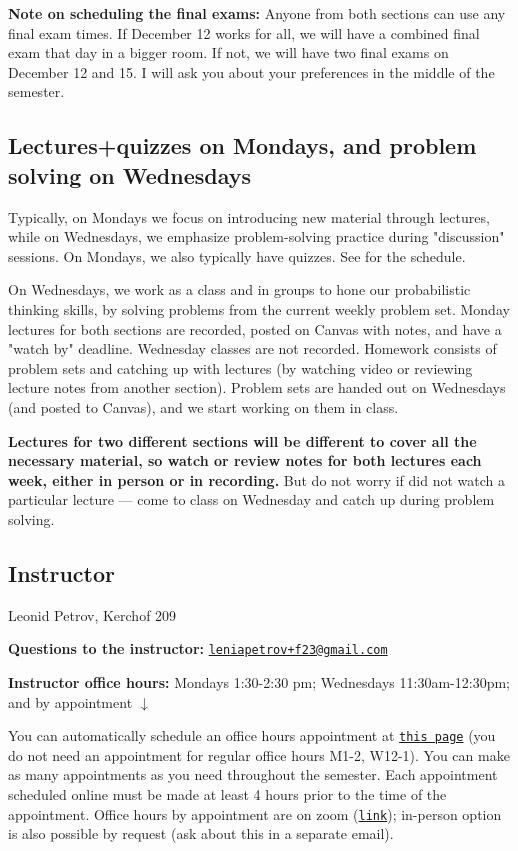 \documentclass[oneside,11pt]{amsart}
\begin{document}
\medskip

\textbf{Note on scheduling the final exams:} Anyone from both sections can use any final exam times. If December 12 works for all, we will have a combined final exam that day in a bigger room. If not, we will have two final exams on December 12 and 15. I will ask you about your preferences in the middle of the semester.


\subsection{Lectures+quizzes on Mondays, and problem solving on Wednesdays}
Typically, on Mondays we focus on introducing new material through lectures, while on Wednesdays, we emphasize problem-solving practice during "discussion" sessions. On Mondays, we also typically have quizzes. See  for the schedule.

On Wednesdays, we work as a class and in groups to hone our probabilistic thinking skills, by solving problems from the current weekly problem set. Monday lectures for both sections are recorded, posted on Canvas with notes, and have a "watch by" deadline. Wednesday classes are not recorded. Homework consists of problem sets and catching up with lectures (by watching video or reviewing lecture notes from another section). Problem sets are handed out on Wednesdays (and posted to Canvas), and we start working on them in class.

\textbf{Lectures for two different sections will be different to cover all the necessary material, so watch or review notes for both lectures each week, either in person or in recording.} But do not worry if did not watch a particular lecture --- come to class on Wednesday and catch up during problem solving.



\subsection{Instructor}

Leonid Petrov, Kerchof 209

\textbf{Questions to the instructor:} \href{mailto:leniapetrov+f23@gmail.com}{\texttt{leniapetrov+f23@gmail.com}}

\textbf{Instructor office hours:} 
Mondays 1:30-2:30 pm; Wednesdays 11:30am-12:30pm; and by appointment $\downarrow$

You can automatically schedule an office hours appointment 
at \href{https://lpetrov.cc/teaching/}{\texttt{this page}} (you do not need an appointment for 
regular office hours M1-2, W12-1).
You can make as many appointments as you need throughout the semester.
Each appointment scheduled online
must be made at least 4 hours prior to the time of the appointment.
Office hours by appointment are on zoom (\href{https://virginia.zoom.us/j/97731277583?pwd=UFNvZ0NHNWRRaHpPTGYrTnJiZ3Rpdz09}{\texttt{link}}); 
in-person option is also possible by request (ask about this in a separate email).
\end{document}
